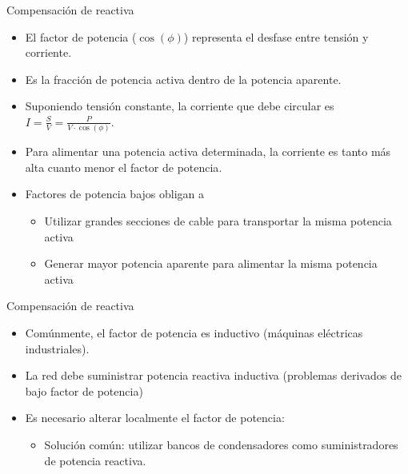 \documentclass[xcolor={usenames,svgnames,dvipsnames}]{beamer}
\begin{document}
\begin{frame}[label={sec:orgfdb946a}]{Compensación de reactiva}
\begin{itemize}
\item El factor de potencia (\(\cos(\phi)\)) representa el desfase entre
tensión y corriente.

\item Es la fracción de potencia activa dentro de la potencia aparente.

\item Suponiendo tensión constante, la corriente que debe circular es
\(I=\frac{S}{V}=\frac{P}{V\cdot\cos(\phi)}\).

\item Para alimentar una potencia activa determinada, \alert{la corriente es
tanto más alta cuanto menor el factor de potencia}.

\item \alert{Factores de potencia bajos} obligan a

\begin{itemize}
\item Utilizar \alert{grandes secciones} de cable para transportar la misma
potencia activa

\item Generar \alert{mayor potencia aparente} para alimentar la misma potencia
activa
\end{itemize}
\end{itemize}
\end{frame}

\begin{frame}[label={sec:orgd78906b}]{Compensación de reactiva}
\begin{itemize}
\item Comúnmente, el factor de potencia es \alert{inductivo} (máquinas eléctricas
industriales).

\item La red debe suministrar potencia reactiva inductiva (problemas
derivados de bajo factor de potencia)

\item Es necesario alterar localmente el factor de potencia:

\begin{itemize}
\item Solución común: utilizar \alert{bancos de condensadores} como
suministradores de potencia reactiva.
\end{itemize}
\end{itemize}
\end{frame}
\end{document}
